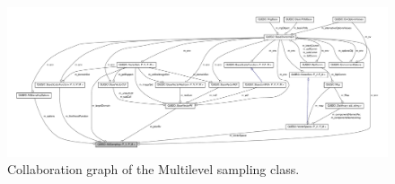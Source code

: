 \begin{figure}[p]
\centering
\includegraphics[scale=.4,clip=true,angle=90]{rawfigs/ml_coll}
 \vspace{-.8cm}
\caption{Collaboration graph of the  Multilevel sampling class.}
\label{fig-Multilevel-coll}
\end{figure}


